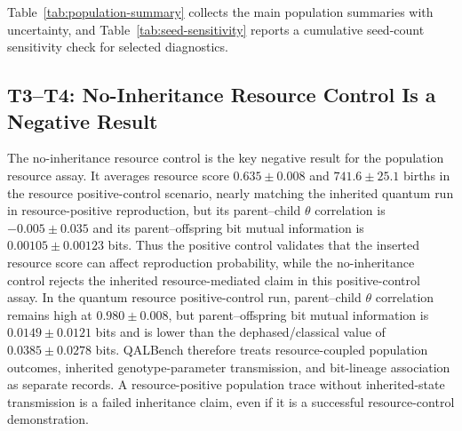 \documentclass[11pt]{article}
\begin{document}
Table~\ref{tab:population-summary} collects the main population summaries with uncertainty, and Table~\ref{tab:seed-sensitivity} reports a cumulative seed-count sensitivity check for selected diagnostics.

\subsection{T3--T4: No-Inheritance Resource Control Is a Negative Result}

The no-inheritance resource control is the key negative result for the population resource assay. It averages resource score $0.635\pm0.008$ and $741.6\pm25.1$ births in the resource positive-control scenario, nearly matching the inherited quantum run in resource-positive reproduction, but its parent--child $\theta$ correlation is $-0.005\pm0.035$ and its parent--offspring bit mutual information is $0.00105\pm0.00123$ bits. Thus the positive control validates that the inserted resource score can affect reproduction probability, while the no-inheritance control rejects the inherited resource-mediated claim in this positive-control assay. In the quantum resource positive-control run, parent--child $\theta$ correlation remains high at $0.980\pm0.008$, but parent--offspring bit mutual information is $0.0149\pm0.0121$ bits and is lower than the dephased/classical value of $0.0385\pm0.0278$ bits. QALBench therefore treats resource-coupled population outcomes, inherited genotype-parameter transmission, and bit-lineage association as separate records. A resource-positive population trace without inherited-state transmission is a failed inheritance claim, even if it is a successful resource-control demonstration.
\end{document}
